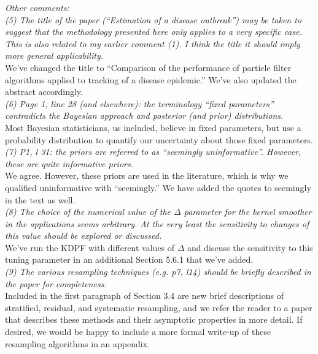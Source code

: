 \documentclass{article}
\begin{document}
\noindent \emph{Other comments:} \\

\noindent \emph{(5) The title of the paper  (``Estimation of a disease outbreak'') may be taken to suggest that the methodology presented here only applies to a very specific case. This is also related to my earlier comment (1). I think the title  it should imply more general applicability.} \\

We've changed the title to ``Comparison of the performance of particle filter algorithms applied to tracking of a disease epidemic.'' We've also updated the abstract accordingly. \\

\noindent \emph{(6) Page 1, line 28 (and elsewhere): the terminology ``fixed parameters'' contradicts the Bayesian approach and posterior (and prior) distributions.} \\

Most Bayesian statisticians, us included, believe in fixed parameters, but use a probability distribution to quantify our uncertainty about those fixed parameters. \\

\noindent \emph{(7) P1, l 31: the priors are referred to as ``seemingly uninformative''. However, these are quite informative priors.} \\

We agree. However, these priors are used in the literature, which is why we qualified uninformative with ``seemingly.'' We have added the quotes to seemingly in the text as well. \\

\noindent \emph{(8) The choice of the numerical value of the $\Delta$ parameter for the kernel smoother in the applications seems arbitrary. At the very least the sensitivity to changes of this value should be explored or discussed.} \\

We've run the KDPF with different values of $\Delta$ and discuss the sensitivity to this tuning parameter in an additional Section 5.6.1 that we've added. \\

\noindent \emph{(9) The various resampling techniques (e.g. p7, l14) should be briefly described in the paper for completeness.} \\

Included in the first paragraph of Section 3.4 are new brief descriptions of stratified, residual, and systematic resampling, and we refer the reader to a paper that describes these methods and their asymptotic properties in more detail. If desired, we would be happy to include a more formal write-up of these resampling algorithms in an appendix. \\
\end{document}
